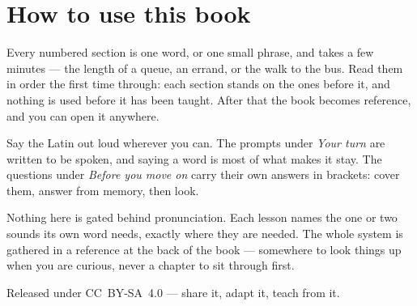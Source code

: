 \documentclass[11pt,twoside]{book}
\begin{document}
\section*{How to use this book}

Every numbered section is one word, or one small phrase, and takes a few
minutes --- the length of a queue, an errand, or the walk to the bus. Read them
in order the first time through: each section stands on the ones before it, and
nothing is used before it has been taught. After that the book becomes
reference, and you can open it anywhere.

Say the Latin out loud wherever you can. The prompts under \emph{Your turn}
are written to be spoken, and saying a word is most of what makes it stay. The
questions under \emph{Before you move on} carry their own answers in brackets:
cover them, answer from memory, then look.

Nothing here is gated behind pronunciation. Each lesson names the one or two
sounds its own word needs, exactly where they are needed. The whole system is
gathered in a reference at the back of the book --- somewhere to look things up
when you are curious, never a chapter to sit through first.

Released under CC~BY-SA~4.0 --- share it, adapt it, teach from it.

\tableofcontents

\mainmatter


\end{document}
